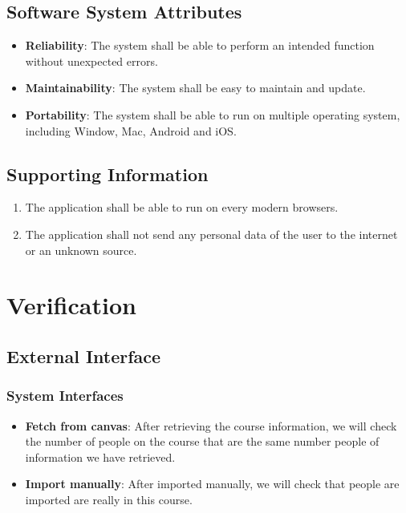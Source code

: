 \documentclass[ 10pt]{report}
\begin{document}
        \section{Software System Attributes}
        \begin{itemize}
            \item \textbf{Reliability}: The system shall be able to perform an intended function without unexpected errors.
            \item \textbf{Maintainability}: The system shall be easy to maintain and update.
            \item \textbf{Portability}: The system shall be able to run on multiple operating system, including Window, Mac, Android and iOS.
        \end{itemize}
        \section{Supporting Information}
        \begin{enumerate}
            \item The application shall be able to run on every modern browsers.
            \item The application shall not send any personal data of the user to the internet or an unknown source.
        \end{enumerate}
    \pagebreak

    \chapter{Verification}
        \section{External Interface}
        \subsection{System Interfaces}
            \begin{itemize}
                \item \textbf{Fetch from canvas}: After retrieving the course information, we will check the number of people on the course that are the same number people of information we have retrieved.
                \item \textbf{Import manually}: After imported manually, we will check that people are imported are really in this course.
            \end{itemize}
\end{document}
